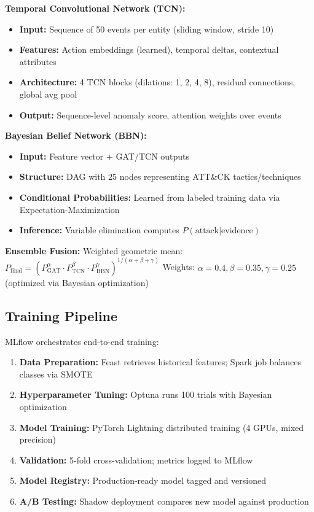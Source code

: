 \textbf{Temporal Convolutional Network (TCN):}
\begin{itemize}
    \item \textbf{Input:} Sequence of 50 events per entity (sliding window, stride 10)
    \item \textbf{Features:} Action embeddings (learned), temporal deltas, contextual attributes
    \item \textbf{Architecture:} 4 TCN blocks (dilations: 1, 2, 4, 8), residual connections, global avg pool
    \item \textbf{Output:} Sequence-level anomaly score, attention weights over events
\end{itemize}

\textbf{Bayesian Belief Network (BBN):}
\begin{itemize}
    \item \textbf{Input:} Feature vector + GAT/TCN outputs
    \item \textbf{Structure:} DAG with 25 nodes representing ATT\&CK tactics/techniques
    \item \textbf{Conditional Probabilities:} Learned from labeled training data via Expectation-Maximization
    \item \textbf{Inference:} Variable elimination computes $P(\text{attack} | \text{evidence})$
\end{itemize}

\textbf{Ensemble Fusion:}
Weighted geometric mean: $P_{\text{final}} = (P_{\text{GAT}}^{\alpha} \cdot P_{\text{TCN}}^{\beta} \cdot P_{\text{BBN}}^{\gamma})^{1/(\alpha+\beta+\gamma)}$
Weights: $\alpha=0.4, \beta=0.35, \gamma=0.25$ (optimized via Bayesian optimization)

\subsection{Training Pipeline}
MLflow orchestrates end-to-end training:
\begin{enumerate}
    \item \textbf{Data Preparation:} Feast retrieves historical features; Spark job balances classes via SMOTE
    \item \textbf{Hyperparameter Tuning:} Optuna runs 100 trials with Bayesian optimization
    \item \textbf{Model Training:} PyTorch Lightning distributed training (4 GPUs, mixed precision)
    \item \textbf{Validation:} 5-fold cross-validation; metrics logged to MLflow
    \item \textbf{Model Registry:} Production-ready model tagged and versioned
    \item \textbf{A/B Testing:} Shadow deployment compares new model against production
\end{enumerate}

